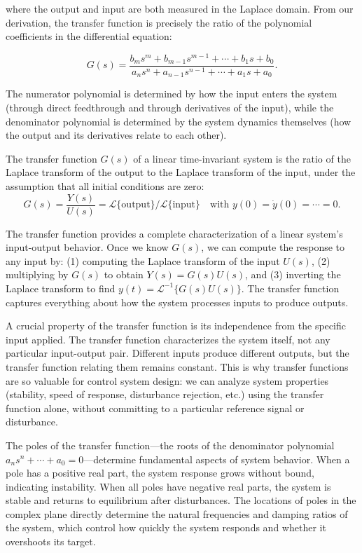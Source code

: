 where the output and input are both measured in the Laplace domain. From our derivation, the transfer function is precisely the ratio of the polynomial coefficients in the differential equation:

\[
G(s) = \frac{b_m s^m + b_{m-1} s^{m-1} + \cdots + b_1 s + b_0}{a_n s^n + a_{n-1} s^{n-1} + \cdots + a_1 s + a_0}.
\]

The numerator polynomial is determined by how the input enters the system (through direct feedthrough and through derivatives of the input), while the denominator polynomial is determined by the system dynamics themselves (how the output and its derivatives relate to each other).

\begin{definition}
The transfer function $G(s)$ of a linear time-invariant system is the ratio of the Laplace transform of the output to the Laplace transform of the input, under the assumption that all initial conditions are zero:
\[
G(s) = \frac{Y(s)}{U(s)} = \mathcal{L}\{\text{output}\} / \mathcal{L}\{\text{input}\} \quad \text{with } y(0) = \dot{y}(0) = \cdots = 0.
\]
\end{definition}

The transfer function provides a complete characterization of a linear system's input-output behavior. Once we know $G(s)$, we can compute the response to any input by: (1) computing the Laplace transform of the input $U(s)$, (2) multiplying by $G(s)$ to obtain $Y(s) = G(s) U(s)$, and (3) inverting the Laplace transform to find $y(t) = \mathcal{L}^{-1}\{G(s) U(s)\}$. The transfer function captures everything about how the system processes inputs to produce outputs.

A crucial property of the transfer function is its independence from the specific input applied. The transfer function characterizes the system itself, not any particular input-output pair. Different inputs produce different outputs, but the transfer function relating them remains constant. This is why transfer functions are so valuable for control system design: we can analyze system properties (stability, speed of response, disturbance rejection, etc.) using the transfer function alone, without committing to a particular reference signal or disturbance.

The poles of the transfer function---the roots of the denominator polynomial $a_n s^n + \cdots + a_0 = 0$---determine fundamental aspects of system behavior. When a pole has a positive real part, the system response grows without bound, indicating instability. When all poles have negative real parts, the system is stable and returns to equilibrium after disturbances. The locations of poles in the complex plane directly determine the natural frequencies and damping ratios of the system, which control how quickly the system responds and whether it overshoots its target.

